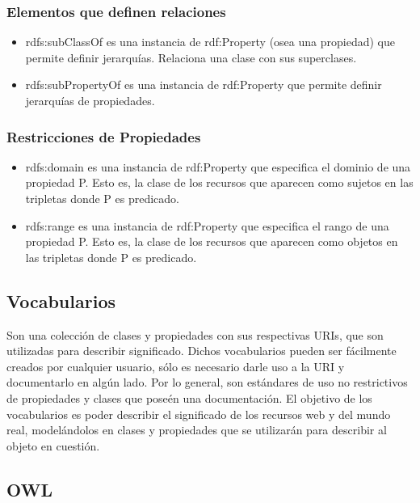 \subsubsection{Elementos que definen relaciones}

\begin{itemize}
  \item rdfs:subClassOf es una instancia de rdf:Property (osea una propiedad) que permite definir jerarquías. Relaciona una clase con sus superclases.

  \item rdfs:subPropertyOf es una instancia de rdf:Property que permite definir jerarquías de propiedades.
\end{itemize}
    
\subsubsection{Restricciones de Propiedades}

\begin{itemize}
   \item rdfs:domain es una instancia de rdf:Property que especifica el dominio de una propiedad P. Esto es, la clase de los recursos que aparecen como sujetos en las tripletas donde P es predicado.

   \item rdfs:range es una instancia de rdf:Property que especifica el rango de una propiedad P. Esto es, la clase de los recursos que aparecen como objetos en las tripletas donde P es predicado.
    
\end{itemize}

\subsection{Vocabularios}

Son una colección de clases y propiedades con sus respectivas URIs, que son utilizadas para describir significado. Dichos vocabularios 
pueden ser fácilmente creados por cualquier usuario, sólo es necesario darle uso a la URI y documentarlo en algún lado. 
Por lo general, son estándares de uso no restrictivos de propiedades y clases que poseén una documentación.
El objetivo de los vocabularios es poder describir el significado de los recursos web y del mundo real, modelándolos en clases y 
propiedades que se utilizarán para describir al objeto en cuestión.

\subsection{OWL}


